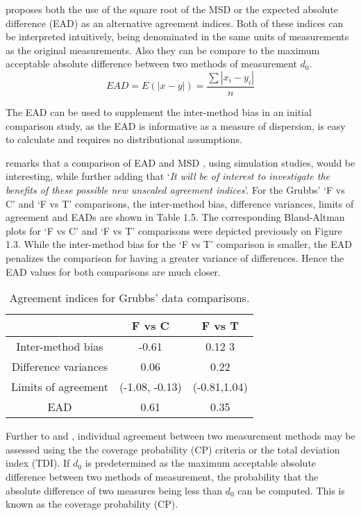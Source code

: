 \documentclass[MAIN.tex]{subfiles}
\begin{document}
	
	\citet{Barnhart} proposes both the use of the square root of the
	MSD or the expected absolute difference (EAD) as an alternative agreement indices. Both of these indices can be interpreted intuitively, being denominated in the same units of measurements as the original
	measurements. Also they can be compare to the maximum acceptable
	absolute difference between two methods of measurement $d_{0}$.
	\[
	EAD = E(|x - y|) = \frac{\sum |x_{i}- y_{i}|}{n}
	\]
	
	The EAD can be used to supplement the inter-method bias in an
	initial comparison study, as the EAD is informative as a measure
	of dispersion, is easy to calculate and requires no distributional
	assumptions.
	
	\citet{Barnhart} remarks that a comparison of EAD and MSD , using
	simulation studies, would be interesting, while further adding
	that `\textit{It will be of interest to investigate the benefits of these
		possible new unscaled agreement indices}'. For the Grubbs' `F vs C' and `F vs T' comparisons, the inter-method bias, difference variances, limits of agreement and EADs are shown
	in Table 1.5. The corresponding Bland-Altman plots for `F vs C' and `F vs T' comparisons were depicted previously on Figure 1.3. While the inter-method bias for the `F vs T' comparison is smaller, the EAD penalizes the comparison for having a greater variance of differences. Hence the EAD values for both comparisons are much closer.
	\begin{table}[ht]
		\begin{center}
			\begin{tabular}{|c|c|c|}
				\hline
				& F vs C & F vs T  \\
				\hline
				Inter-method bias & -0.61 & 0.12 3 \\
				Difference variances & 0.06 & 0.22  \\
				Limits of agreement & (-1.08,	-0.13) & (-0.81,1.04) \\
				EAD & 0.61 & 0.35  \\
				\hline
			\end{tabular}
			\caption{Agreement indices for Grubbs' data comparisons.}
		\end{center}
	\end{table}
	
	Further to  \citet{lin2000} and \citet{lin2002}, individual agreement between two measurement methods may be
	assessed using the the coverage probability (CP) criteria or the total deviation index (TDI). If $d_{0}$ is predetermined as the maximum acceptable absolute difference between two methods of measurement, the probability that the absolute difference of two measures being less than $d_{0}$ can be computed. This is known as the coverage probability (CP).
	
\end{document}
